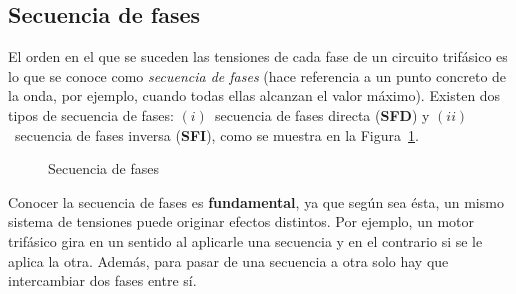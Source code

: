 \documentclass[11pt]{book} %
\begin{document}
	\subsection{Secuencia de fases}\label{sec.secuencia_fases}
	
	El orden en el que se suceden las tensiones de cada fase de un circuito trifásico es lo que se conoce como \textit{secuencia de fases} (hace referencia a un punto concreto de la onda, por ejemplo, cuando todas ellas alcanzan el valor máximo). Existen dos tipos de secuencia de fases: $(i)$~secuencia de fases directa (\textbf{SFD}) y $(ii)$~secuencia de fases inversa (\textbf{SFI}), como se muestra en la Figura~\ref{fig.secuencia_fases}. 
	\begin{figure}[htbp]
		\centering
		\hfil
		\caption{Secuencia de fases}
		\label{fig.secuencia_fases}
	\end{figure}
	
	
	Conocer la secuencia de fases es \textbf{fundamental}, ya que según sea ésta, un mismo sistema de tensiones puede originar efectos distintos. Por ejemplo, un motor trifásico gira en un sentido al aplicarle
	una secuencia y en el contrario si se le aplica la otra. Además, para pasar de una secuencia a otra solo hay que intercambiar dos fases entre sí.
	
\end{document}
